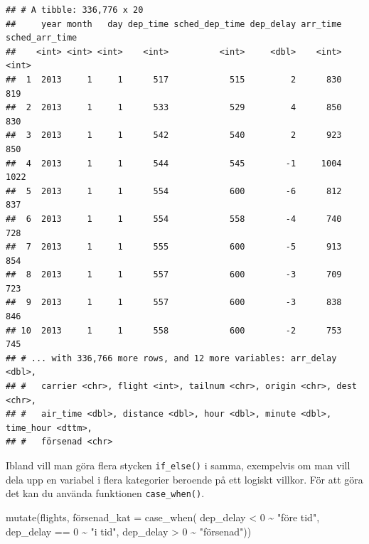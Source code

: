 \documentclass[
]{book}
\newenvironment{Shaded}{\begin{snugshade}}{\end{snugshade}}
\newcommand{\AttributeTok}[1]{\textcolor[rgb]{0.77,0.63,0.00}{#1}}
\newcommand{\DecValTok}[1]{\textcolor[rgb]{0.00,0.00,0.81}{#1}}
\newcommand{\FunctionTok}[1]{\textcolor[rgb]{0.00,0.00,0.00}{#1}}
\newcommand{\NormalTok}[1]{#1}
\newcommand{\SpecialCharTok}[1]{\textcolor[rgb]{0.00,0.00,0.00}{#1}}
\newcommand{\StringTok}[1]{\textcolor[rgb]{0.31,0.60,0.02}{#1}}
\begin{document}
\begin{verbatim}
## # A tibble: 336,776 x 20
##     year month   day dep_time sched_dep_time dep_delay arr_time sched_arr_time
##    <int> <int> <int>    <int>          <int>     <dbl>    <int>          <int>
##  1  2013     1     1      517            515         2      830            819
##  2  2013     1     1      533            529         4      850            830
##  3  2013     1     1      542            540         2      923            850
##  4  2013     1     1      544            545        -1     1004           1022
##  5  2013     1     1      554            600        -6      812            837
##  6  2013     1     1      554            558        -4      740            728
##  7  2013     1     1      555            600        -5      913            854
##  8  2013     1     1      557            600        -3      709            723
##  9  2013     1     1      557            600        -3      838            846
## 10  2013     1     1      558            600        -2      753            745
## # ... with 336,766 more rows, and 12 more variables: arr_delay <dbl>,
## #   carrier <chr>, flight <int>, tailnum <chr>, origin <chr>, dest <chr>,
## #   air_time <dbl>, distance <dbl>, hour <dbl>, minute <dbl>, time_hour <dttm>,
## #   försenad <chr>
\end{verbatim}

Ibland vill man göra flera stycken \texttt{if\_else()} i samma, exempelvis om man vill dela upp en variabel i flera kategorier beroende på ett logiskt villkor. För att göra det kan du använda funktionen \texttt{case\_when()}.

\begin{Shaded}
\begin{Highlighting}[]
\FunctionTok{mutate}\NormalTok{(flights, försenad}\AttributeTok{\_kat =} \FunctionTok{case\_when}\NormalTok{(}
\NormalTok{dep\_delay }\SpecialCharTok{\textless{}} \DecValTok{0} \SpecialCharTok{\textasciitilde{}} \StringTok{"före tid"}\NormalTok{,}
\NormalTok{dep\_delay }\SpecialCharTok{==} \DecValTok{0} \SpecialCharTok{\textasciitilde{}} \StringTok{"i tid"}\NormalTok{,}
\NormalTok{dep\_delay }\SpecialCharTok{\textgreater{}} \DecValTok{0} \SpecialCharTok{\textasciitilde{}} \StringTok{"försenad"}\NormalTok{)) }
\end{Highlighting}
\end{Shaded}
\end{document}
